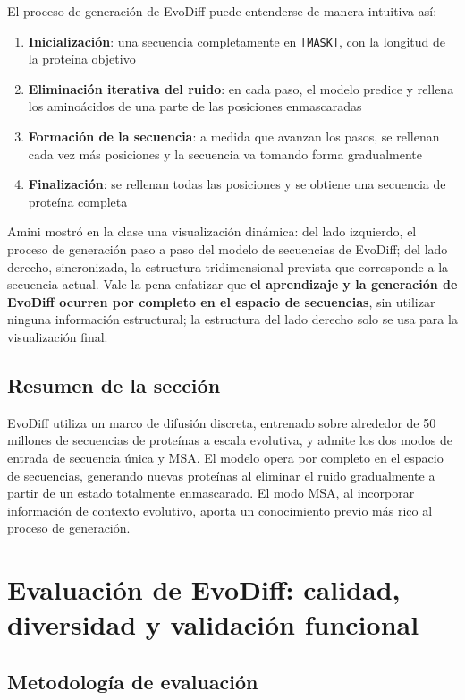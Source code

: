 \documentclass[a4paper]{article}
\begin{document}
El proceso de generación de EvoDiff puede entenderse de manera intuitiva así:

\begin{enumerate}
    \item \textbf{Inicialización}: una secuencia completamente en \texttt{[MASK]}, con la longitud de la proteína objetivo
    \item \textbf{Eliminación iterativa del ruido}: en cada paso, el modelo predice y rellena los aminoácidos de una parte de las posiciones enmascaradas
    \item \textbf{Formación de la secuencia}: a medida que avanzan los pasos, se rellenan cada vez más posiciones y la secuencia va tomando forma gradualmente
    \item \textbf{Finalización}: se rellenan todas las posiciones y se obtiene una secuencia de proteína completa
\end{enumerate}

Amini mostró en la clase una visualización dinámica: del lado izquierdo, el proceso de generación paso a paso del modelo de secuencias de EvoDiff; del lado derecho, sincronizada, la estructura tridimensional prevista que corresponde a la secuencia actual. Vale la pena enfatizar que \textbf{el aprendizaje y la generación de EvoDiff ocurren por completo en el espacio de secuencias}, sin utilizar ninguna información estructural; la estructura del lado derecho solo se usa para la visualización final.

\subsection{Resumen de la sección}

EvoDiff utiliza un marco de difusión discreta, entrenado sobre alrededor de 50 millones de secuencias de proteínas a escala evolutiva, y admite los dos modos de entrada de secuencia única y MSA. El modelo opera por completo en el espacio de secuencias, generando nuevas proteínas al eliminar el ruido gradualmente a partir de un estado totalmente enmascarado. El modo MSA, al incorporar información de contexto evolutivo, aporta un conocimiento previo más rico al proceso de generación.
\section{Evaluación de EvoDiff: calidad, diversidad y validación funcional}

\subsection{Metodología de evaluación}
\end{document}
